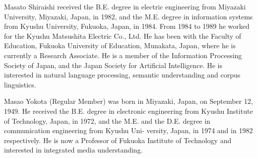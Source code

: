 \begin{biography}

\biotitle{}

{ Masato Shiraishi received the B.E. degree in electric engineering
from Miyazaki University, Miyazaki, Japan, in 1982, and the M.E.
degree in information systems from Kyushu University, Fukuoka, Japan,
in 1984. From 1984 to 1989 he worked for the Kyushu Matsushita
Electric Co., Ltd. He has been with the Faculty of
Education, Fukuoka University of Education, Munakata, Japan, where he
is currently a Research Associate.  He is a member of the Information
Processing Society of Japan, and the Japan Society for Artificial
Intelligence. He is interested in natural language processing,
semantic understanding and corpus linguistics. }

{
Masao Yokota (Regular Member) was born in Miyazaki, Japan, \hspace{-0.1mm}on\hspace{-0.1mm} September \hspace{-0.1mm}12, \hspace{-1mm}1949.\hspace{-1mm} He \hspace{-0.1mm}received \hspace{-0.1mm}the \hspace{-0.1mm}B.E. \hspace{-0.1mm}degree\hspace{-0.1mm} in\hspace{-0.1mm} electronic
engineering from Kyushu Institute of Technology, Japan, in 1972, and
the M.E. \hspace{-0.1mm}and \hspace{-0.1mm}the \hspace{-0.1mm}D.E. \hspace{-0.1mm}degree \hspace{-0.1mm}in \hspace{-0.1mm}communication \hspace{-0.1mm}engineering\hspace{-0.1mm} from\hspace{-0.1mm} Kyushu \hspace{-0.1mm}
Uni- versity, Japan, in 1974 and in 1982 respectively.  He is now a
Professor of Fukuoka Institute of Technology and interested in
integrated media understanding.}



\end{biography}


